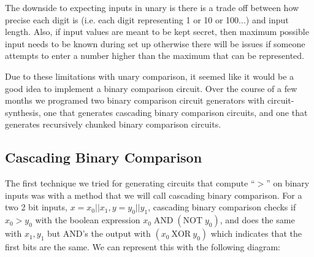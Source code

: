 \documentclass[12pt,twoside]{reedthesis}
\begin{document}
   The downside to expecting inputs in unary is there is a trade off between how precise each digit is (i.e. each digit representing 1 or 10 or 100...) and input length. Also, if input values are meant to be kept secret, then maximum possible input needs to be known during set up otherwise there will be issues if someone attempts to enter a number higher than the maximum that can be represented.
   \par Due to these limitations with unary comparison, it seemed like it would be a good idea to implement a binary comparison circuit.  Over the course of a few months we programed two binary comparison circuit generators with circuit-synthesis, one that generates cascading binary comparison circuits, and one that generates recursively chunked binary comparison circuits.
   
   \subsection{Cascading Binary Comparison}
   \newcommand{\AND}[0]{\text{AND}}
   \newcommand{\OR}[0]{\text{OR}}
   \newcommand{\NOT}[0]{\text{NOT}}
   \newcommand{\XOR}[0]{\text{XOR}}
   
   The first technique we tried for generating circuits that compute ``$>$'' on binary inputs was with a method that we will call cascading binary comparison. For a two 2 bit inputs, $x = x_0||x_1,y= y_0||y_1$, cascading binary comparison checks if $x_0 > y_0$ with the boolean expression $x_0\; \AND\; (\NOT \; y_0)$, and does the same with $x_1,y_1$ but AND's the output with $(x_0\ \XOR\ y_0)$ which indicates that the first bits are the same. We can represent this with the following diagram:
   \\
   \begin{center}
\end{center}
   
\end{document}
